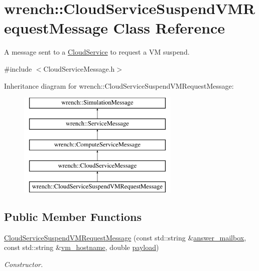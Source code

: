 \hypertarget{classwrench_1_1_cloud_service_suspend_v_m_request_message}{}\section{wrench\+:\+:Cloud\+Service\+Suspend\+V\+M\+Request\+Message Class Reference}
\label{classwrench_1_1_cloud_service_suspend_v_m_request_message}


A message sent to a \hyperlink{classwrench_1_1_cloud_service}{Cloud\+Service} to request a VM suspend.  




{\ttfamily \#include $<$Cloud\+Service\+Message.\+h$>$}

Inheritance diagram for wrench\+:\+:Cloud\+Service\+Suspend\+V\+M\+Request\+Message\+:\begin{figure}[H]
\begin{center}
\leavevmode
\includegraphics[height=5.000000cm]{classwrench_1_1_cloud_service_suspend_v_m_request_message}
\end{center}
\end{figure}
\subsection*{Public Member Functions}
\begin{DoxyCompactItemize}
\item 
\hyperlink{classwrench_1_1_cloud_service_suspend_v_m_request_message_a4cb16193c85d189c65fabf650249b535}{Cloud\+Service\+Suspend\+V\+M\+Request\+Message} (const std\+::string \&\hyperlink{classwrench_1_1_cloud_service_suspend_v_m_request_message_a098f26ba796ea02ed812f42ca2ec69ab}{answer\+\_\+mailbox}, const std\+::string \&\hyperlink{classwrench_1_1_cloud_service_suspend_v_m_request_message_afe8e071668d420d40e83a21e2472d788}{vm\+\_\+hostname}, double \hyperlink{classwrench_1_1_simulation_message_a914f2732713f7c02898e66f05a7cb8a1}{payload})
\begin{DoxyCompactList}\small\item\em Constructor. \end{DoxyCompactList}\end{DoxyCompactItemize}
